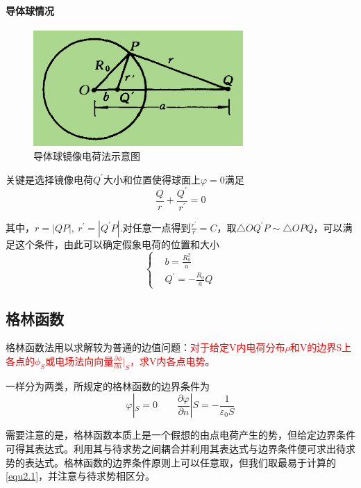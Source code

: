 \documentclass[UTF8]{ctexart}
\newcommand{\red}{\textcolor{red}}
\begin{document}
    \paragraph{导体球情况}
    \begin{figure}[htb]
        \centering
        \includegraphics[width=8cm]{figure2-1.png}
        \caption{导体球镜像电荷法示意图}
        \label{figure2.1}
    \end{figure}
    关键是选择镜像电荷$Q^{\prime}$大小和位置使得球面上$\varphi=0$满足
    \begin{equation}
        \frac{Q}{r} + \frac{Q^{\prime}}{r^{\prime}} = 0
    \end{equation}

\noindent 其中，$r = |QP|,\ r^{\prime} = |Q^{\prime} P|$.对任意一点得到$\frac{r^{\prime}}{r} = C$，取$\triangle OQ^{\prime}P \sim \triangle OPQ$，可以满足这个条件，由此可以确定假象电荷的位置和大小
\begin{equation}
    \left \{ \begin{aligned}
        &b = \frac{R_0^2}{a} \\ 
        &Q^{\prime} = - \frac{R_0}{a} Q
    \end{aligned} \right.
\end{equation}

    \subsection{格林函数}
    格林函数法用以求解较为普通的边值问题：\red{对于给定V内电荷分布$\rho$和V的边界S上各点的$\phi_S$或电场法向向量$\frac{\partial \phi}{\partial n}|_S$，求V内各点电势}。

    一样分为两类，所规定的格林函数的边界条件为
    \begin{equation}
        \varphi|_S = 0 \qquad \frac{\partial \varphi}{\partial n}|S = - \frac{1}{\varepsilon_0 S} \label{equ2.1}
    \end{equation}

\noindent 需要注意的是，格林函数本质上是一个假想的由点电荷产生的势，但给定边界条件可得其表达式。利用其与待求势之间耦合并利用其表达式与边界条件便可求出待求势的表达式。格林函数的边界条件原则上可以任意取，但我们取最易于计算的\autoref{equ2.1}，并注意与待求势相区分。
\end{document}
